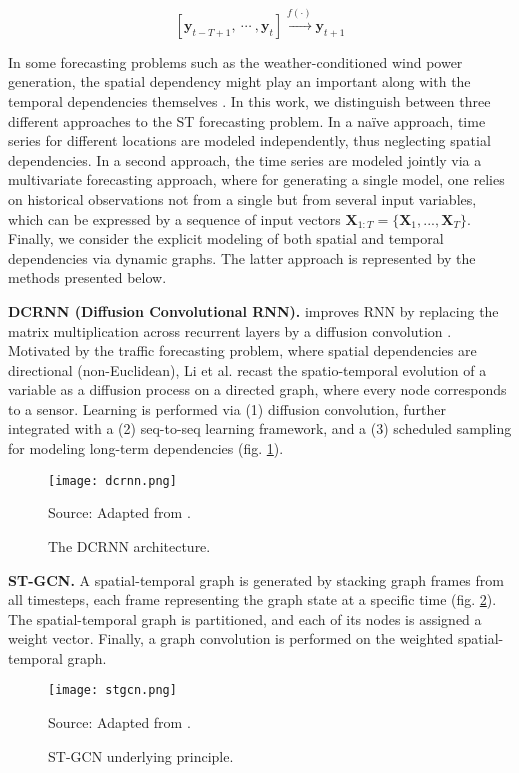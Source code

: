 \begin{equation}\label{eq:stf}
    [\boldsymbol{y}_{t-T+1}, \  \cdots\ , \boldsymbol{y}_{t}] \xrightarrow{f(\cdot)} \boldsymbol{y}_{t+1}
\end{equation}

In some forecasting problems such as the weather-conditioned wind power generation, the spatial dependency might play an important along with the temporal dependencies themselves \cite{engeland2017variability}.
In this work, we distinguish between three different approaches to the ST forecasting problem.
In a naïve approach, time series for different locations are modeled independently, thus neglecting spatial dependencies.
In a second approach, the time series are modeled jointly via a multivariate forecasting approach, where for generating a single model, one relies on historical observations not from a single but from several input variables, which can be expressed by a sequence of input vectors $\boldsymbol{X}_{1:T} = \{\boldsymbol{X}_1, ..., \boldsymbol{X}_T\}$.
Finally, we consider the explicit modeling of both spatial and temporal dependencies via dynamic graphs.
The latter approach is represented by the methods presented below.

\vspace{1em}
\noindent
\textbf{DCRNN (Diffusion Convolutional RNN).} improves RNN by replacing the matrix multiplication across recurrent layers by a diffusion convolution \cite{liu2020intro}.
Motivated by the traffic forecasting problem, where spatial dependencies are directional (non-Euclidean), Li et al. \cite{li2018dcrnn} recast the spatio-temporal evolution of a variable as a diffusion process on a directed graph, where every node corresponds to a sensor.
Learning is performed via (1) diffusion convolution, further integrated with a (2) seq-to-seq learning framework, and a (3) scheduled sampling for modeling long-term dependencies (fig. \ref{fig:dcrnn}).
\begin{figure}[H]
   \centering
   \caption{The DCRNN architecture.}
   \texttt{[image: dcrnn.png]}  \\
    \raggedright
    Source: Adapted from \cite{li2018dcrnn}.
   \label{fig:dcrnn}
\end{figure}

\noindent
\textbf{ST-GCN.} A spatial-temporal graph is generated by stacking graph frames from all timesteps, each frame representing the graph state at a specific time (fig. \ref{fig:stgcn}).
The spatial-temporal graph is partitioned, and each of its nodes is assigned a weight vector.
Finally, a graph convolution is performed on the weighted spatial-temporal graph.
\begin{figure}[H]
   \centering
   \caption{ST-GCN underlying principle.}
   \texttt{[image: stgcn.png]}  \\
    \raggedright
    Source: Adapted from \cite{liu2019st-mgcn}.
   \label{fig:stgcn}
\end{figure}

